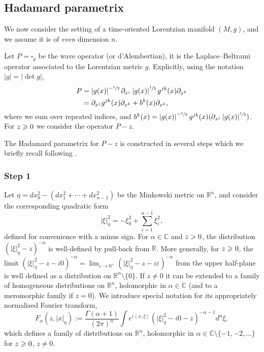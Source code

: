 \documentclass[10pt]{amsart}
\theoremstyle{definition}
\newcommand\rr{{\mathbb R}}
\newcommand\cc{{\mathbb C}}
\let\cv\alpha
\let\Im\relax
\DeclareMathOperator{\Im}{Im}
\newcommand*{\defeq}{:=}
\newcommand{\module}[1]{\left|#1\right|}
\def\s12{\sfrac{1}{2}}
\newcommand{\Fs}[2][\cv]{F_{#1}(#2,\vert x\vert_\eta)}
\begin{document}
\subsection{Hadamard parametrix} \label{s:hadamardformal}

We now consider the setting of a time-oriented Lorentzian manifold $(M,g)$, and we assume it is of \emph{even} dimension $n$.

Let $P=\square_g$ be the wave operator (or d'Alembertian), \ie it is the Laplace--Beltrami operator associated to the Lorentzian metric $g$. Explicitly, using the notation $\module{g}=\module{\det g}$,
\[
\begin{aligned}
P&=\module{g(x)}^{-\sfrac{1}{2}}\partial_{x^j} \module{g(x)}^{\sfrac{1}{2}}g^{jk}(x)\partial_{x^k} \\
& = \partial_{x^j}g^{jk}(x)\partial_{x^k}+b^k(x)\partial_{x^k},
\end{aligned}
\]
where we sum over repeated indices, and $b^k(x)=\module{g(x)}^{-\s12} g^{jk}(x)(\partial_{x^j}\module{g(x)}^{\sfrac{1}{2}})$. For $\Im z\geqslant 0$ we consider the operator $P-z$.

The Hadamard parametrix for $P-z$ is constructed in several steps which we briefly recall following \cite{Dang2020}.

\subsubsection*{Step 1} Let $\eta=dx_0^2-(dx_1^2+\cdots+dx_{n-1}^2)$ be the Minkowski metric on $\rr^n$, and consider the corresponding quadratic form
\[
\vert\xi\vert_\eta^2 = -\xi_0^2+\sum_{i=1}^{n-1}\xi_i^2,
\]
defined for convenience with a {minus} sign. For $\cv\in \cc$ and $\Im z >0$, the distribution $\left(\vert\xi\vert_\eta^2-z \right)^{-\cv}$ is well-defined by pull-back from $\rr$. More generally, for $\Im z \geqslant 0$, the limit $\left(\vert\xi\vert_\eta^2-z -i0\right)^{-\cv}=\lim_{\varepsilon\to 0^+}\left(\vert\xi\vert_\eta^2-z -i\varepsilon\right)^{-\cv}$ from the upper half-plane is well defined as a distribution on $\rr^n\setminus \{0\}$. If $z\neq 0$ it can be extended to a family of homogeneous distributions on $\rr^n$, holomorphic in $\cv\in \cc$ (and to a meromorphic family if $z=0$). We introduce special notation for its appropriately normalized Fourier transform,
\begin{equation}\label{eq:defFsz}
\Fs{z}\defeq\frac{\Gamma(\cv+1)}{(2\pi)^{n}} \int e^{i\left\langle x,\xi \right\rangle}\left(\vert\xi\vert_\eta^2-i0-z \right)^{-\cv-1}d^{n}\xi,
\end{equation}
which defines a family of distributions on $\rr^n$, holomorphic in $\cv\in\cc\setminus\{-1,-2,\dots\}$ for $\Im z\geqslant 0$, $z\neq 0$.
\end{document}
